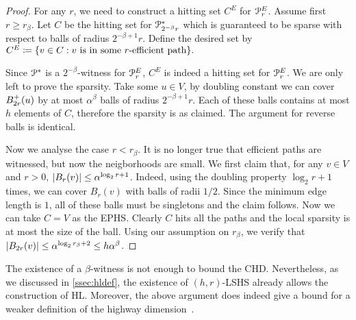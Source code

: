 \begin{proof}
For any $r$, we need to construct a hitting set $C^E$ for $\mathcal{P}^E_r$.
Assume first $r\geq r_\beta$.
Let $C$ be the hitting set for $\mathcal{P}^*_{2^{-\beta}r}$ which is guaranteed to be sparse with respect to balls of radius $2^{-\beta+1}r$.
Define the desired set by
$
C^E\coloneqq\{v\in C: v \text{ is in some $r$-efficient path} \}.
$

Since $\mathcal{P}^*$ is a $2^{-\beta}$-witness for $\mathcal{P}^E_r$, $C^E$ is indeed a hitting set for $\mathcal{P}^E_r$.
We are only left to prove the sparsity.
Take some $u\in V$, by doubling constant we can cover $B^+_{2r}(u)$ by at most $\alpha^\beta$ balls of radius $2^{-\beta+1}r$.
Each of these balls contains at most $h$ elements of $C$, therefore the sparsity is as claimed.
The argument for reverse balls is identical.

Now we analyse the case $r< r_\beta$.
It is no longer true that efficient paths are witnessed, but now the neigborhoods are small.
We first claim that, for any $v\in V$ and $r>0$, $\lvert B_{r}(v)\rvert\leq \alpha^{\log_2r+1}$.
Indeed, using the doubling property $\log_2r+1$ times, we can cover $B_r(v)$ with balls of radii $1/2$.
Since the minimum edge length is $1$, all of these balls must be singletons and the claim follows.
Now we can take $C=V$ as the EPHS.
Clearly $C$ hits all the paths and the local sparsity is at most the size of the ball.
Using our assumption on $r_\beta$, we verify that $\lvert B_{2r}(v)\rvert\leq \alpha^{\log_2r_\beta+2}\leq h\alpha^\beta$. 
\end{proof}
\begin{remark}
The existence of a $\beta$-witness is not enough to bound the CHD. 
Nevertheless, as we discussed in \cref{ssec:hldef}, the existence of $(h,r)$-LSHS already allows the construction of HL. Moreover, the above argument does indeed give a bound for a weaker definition of the highway dimension~\citep{highway2010}.
\end{remark}